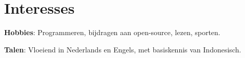 \section{Interesses}
 \resumeSubHeadingListStart
   \item{
     \textbf{Hobbies}{: Programmeren, bijdragen aan open-source, lezen, sporten.}
   }
   \item{
     \textbf{Talen}{: Vloeiend in Nederlands en Engels, met basiskennis van Indonesisch.}
   }
 \resumeSubHeadingListEnd
